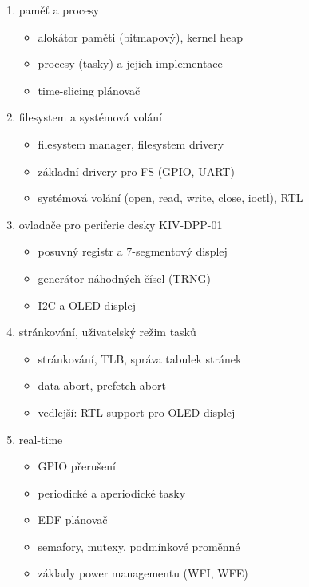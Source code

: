 \documentclass{article}
\newcommand\lang[2]{#1}
\begin{document}
\begin{enumerate}
	\item \lang{paměť a procesy}{memory and processes}
	\begin{itemize}
		\item \lang{alokátor paměti (bitmapový)}{memory allocator (bitmap)}, kernel heap
		\item \lang{procesy (tasky) a jejich implementace}{processes (tasks) and their implementation}
		\item time-slicing \lang{plánovač}{scheduler}
	\end{itemize}

	\item \lang{filesystem a systémová volání}{filesystem and syscalls}
	\begin{itemize}
		\item filesystem manager, filesystem \lang{drivery}{drivers}
		\item \lang{základní drivery pro FS}{basic filessystem drivers} (GPIO, UART)
		\item \lang{systémová volání}{syscalls} (open, read, write, close, ioctl), RTL
	\end{itemize}

	\item \lang{ovladače pro periferie desky}{drivers for} KIV-DPP-01
	\begin{itemize}
		\item \lang{posuvný registr a 7-segmentový displej}{shift register and 7-segment display}
		\item \lang{generátor náhodných čísel}{random number generator} (TRNG)
		\item \lang{I2C a OLED displej}{I2C and OLED display}
	\end{itemize}

	\item \lang{stránkování, uživatelský režim tasků}{memory protection, paging and userspace}
	\begin{itemize}
		\item \lang{stránkování, TLB, správa tabulek stránek}{paging, TLB and page table management}
		\item data abort, prefetch abort
		\item \lang{vedlejší: RTL support pro OLED displej}{optional: RTL support for OLED display}
	\end{itemize}

	\item real-time
	\begin{itemize}
		\item \lang{GPIO přerušení}{GPIO interrupts}
		\item \lang{periodické a aperiodické tasky}{periodic and aperiodic tasks}
		\item \lang{EDF plánovač}{EDF scheduler}
		\item \lang{semafory, mutexy, podmínkové proměnné}{semaphores, mutexes, condition variables}
		\item \lang{základy power managementu}{basic power management} (WFI, WFE)
	\end{itemize}


\end{enumerate}
\end{document}
